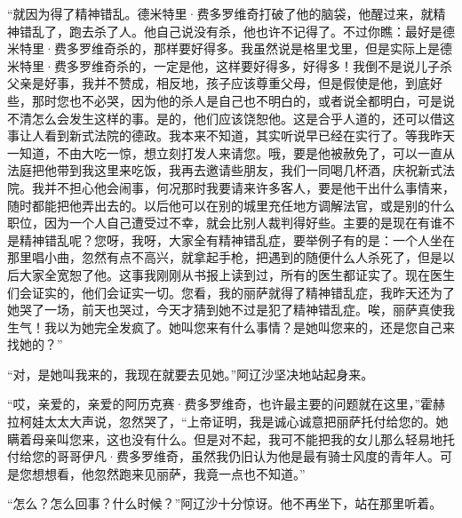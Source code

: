 \par “就因为得了精神错乱。德米特里·费多罗维奇打破了他的脑袋，他醒过来，就精神错乱了，跑去杀了人。他自己说没有杀，他也许不记得了。不过你瞧：最好是德米特里·费多罗维奇杀的，那样要好得多。我虽然说是格里戈里，但是实际上是德米特里·费多罗维奇杀的，一定是他，这样要好得多，好得多！我倒不是说儿子杀父亲是好事，我并不赞成，相反地，孩子应该尊重父母，但是假使是他，到底好些，那时您也不必哭，因为他的杀人是自己也不明白的，或者说全都明白，可是说不清怎么会发生这样的事。是的，他们应该饶恕他。这是合乎人道的，还可以借这事让人看到新式法院的德政。我本来不知道，其实听说早已经在实行了。等我昨天一知道，不由大吃一惊，想立刻打发人来请您。哦，要是他被赦免了，可以一直从法庭把他带到我这里来吃饭，我再去邀请些朋友，我们一同喝几杯酒，庆祝新式法院。我并不担心他会闹事，何况那时我要请来许多客人，要是他干出什么事情来，随时都能把他弄出去的。以后他可以在别的城里充任地方调解法官，或是别的什么职位，因为一个人自己遭受过不幸，就会比别人裁判得好些。主要的是现在有谁不是精神错乱呢？您呀，我呀，大家全有精神错乱症，要举例子有的是：一个人坐在那里唱小曲，忽然有点不高兴，就拿起手枪，把遇到的随便什么人杀死了，但是以后大家全宽恕了他。这事我刚刚从书报上读到过，所有的医生都证实了。现在医生们会证实的，他们会证实一切。您看，我的丽萨就得了精神错乱症，我昨天还为了她哭了一场，前天也哭过，今天才猜到她不过是犯了精神错乱症。唉，丽萨真使我生气！我以为她完全发疯了。她叫您来有什么事情？是她叫您来的，还是您自己来找她的？”
\par “对，是她叫我来的，我现在就要去见她。”阿辽沙坚决地站起身来。
\par “哎，亲爱的，亲爱的阿历克赛·费多罗维奇，也许最主要的问题就在这里，”霍赫拉柯娃太太大声说，忽然哭了，“上帝证明，我是诚心诚意把丽萨托付给您的。她瞒着母亲叫您来，这也没有什么。但是对不起，我可不能把我的女儿那么轻易地托付给您的哥哥伊凡·费多罗维奇，虽然我仍旧认为他是最有骑士风度的青年人。可是您想想看，他忽然跑来见丽萨，我竟一点也不知道。”
\par “怎么？怎么回事？什么时候？”阿辽沙十分惊讶。他不再坐下，站在那里听着。
